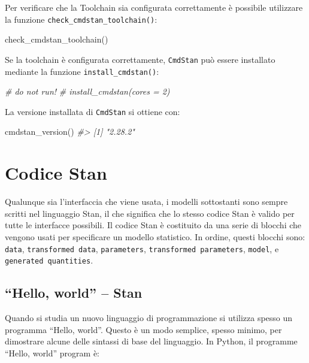 \documentclass[
  11pt,
]{krantz}
\makeatletter
\newenvironment{Shaded}{\begin{snugshade}}{\end{snugshade}}
\newcommand{\CommentTok}[1]{\textcolor[rgb]{0.37,0.37,0.37}{\textit{#1}}}
\newcommand{\FunctionTok}[1]{\textcolor[rgb]{0,0,0}{#1}}
\newcommand{\NormalTok}[1]{#1}
\newenvironment{kframe}{%
\medskip{}
\setlength{\fboxsep}{.8em}
 \def\at@end@of@kframe{}%
 \ifinner\ifhmode%
  \def\at@end@of@kframe{\end{minipage}}%
  \begin{minipage}{\columnwidth}%
 \fi\fi%
 \def\FrameCommand##1{\hskip\@totalleftmargin \hskip-\fboxsep
 \colorbox{shadecolor}{##1}\hskip-\fboxsep
     \hskip-\linewidth \hskip-\@totalleftmargin \hskip\columnwidth}%
 \MakeFramed {\advance\hsize-\width
   \@totalleftmargin\z@ \linewidth\hsize
   \@setminipage}}%
 {\par\unskip\endMakeFramed%
 \at@end@of@kframe}
\renewenvironment{Shaded}{\begin{kframe}}{\end{kframe}}
\theoremstyle{definition}
\theoremstyle{definition}
\theoremstyle{definition}
\theoremstyle{definition}
\theoremstyle{remark}
\makeatother
\begin{document}
Per verificare che la Toolchain sia configurata correttamente è possibile utilizzare la funzione \texttt{check\_cmdstan\_toolchain()}:

\begin{Shaded}
\begin{Highlighting}[]
\FunctionTok{check\_cmdstan\_toolchain}\NormalTok{()}
\end{Highlighting}
\end{Shaded}

Se la toolchain è configurata correttamente, \texttt{CmdStan} può essere installato mediante la funzione \texttt{install\_cmdstan()}:

\begin{Shaded}
\begin{Highlighting}[]
\CommentTok{\# do not run!}
\CommentTok{\# install\_cmdstan(cores = 2)}
\end{Highlighting}
\end{Shaded}

La versione installata di \texttt{CmdStan} si ottiene con:

\begin{Shaded}
\begin{Highlighting}[]
\FunctionTok{cmdstan\_version}\NormalTok{()}
\CommentTok{\#\textgreater{} [1] "2.28.2"}
\end{Highlighting}
\end{Shaded}

\hypertarget{codice-stan}{%
\section{Codice Stan}\label{codice-stan}}

Qualunque sia l'interfaccia che viene usata, i modelli sottostanti sono sempre scritti nel linguaggio Stan, il che significa che lo stesso codice Stan è valido per tutte le interfacce possibili. Il codice Stan è costituito da una serie di blocchi che vengono usati per specificare un modello statistico. In ordine, questi blocchi sono: \texttt{data}, \texttt{transformed\ data}, \texttt{parameters}, \texttt{transformed\ parameters}, \texttt{model}, e \texttt{generated\ quantities}.

\hypertarget{hello-world-stan}{%
\subsection{``Hello, world'' -- Stan}\label{hello-world-stan}}

Quando si studia un nuovo linguaggio di programmazione si utilizza spesso un programma ``Hello, world''. Questo è un modo semplice, spesso minimo, per dimostrare alcune delle sintassi di base del linguaggio. In Python, il programme ``Hello, world'' program è:
\end{document}
